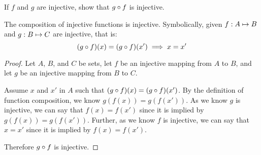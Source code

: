 \documentclass[main.tex]{subfiles}
\begin{document}
\subproblem{}\label{s2p4b}

If \(f\) and \(g\) are injective, show that \({g} \circ{} {f}\) is injective.

\begin{thm}
	The composition of injective functions is injective. Symbolically, given
	\({f}: {A} \mapsto{} {B}\) and \({g}: {B} \mapsto{} {C}\) are injective, that is:
	\[({g} \circ{} {f})(x) = ({g} \circ{} {f})(x') \implies x = x'\]
\end{thm}
\begin{proof}
	Let \(A\), \(B\), and \(C\) be sets, let \(f\) be an injective mapping
	from \(A\) to \(B\), and let \(g\) be an injective mapping from \(B\) to
	\(C\).

	Assume \(x\) and \(x'\) in \(A\) such that
	\(({g} \circ{} {f})(x) = ({g} \circ{} {f})(x')\). By the definition of
	function composition, we know \(g(f(x)) = g(f(x'))\). As we know \(g\)
	is injective, we can say that \(f(x) = f(x')\) since it is implied by
	\(g(f(x)) = g(f(x'))\). Further, as we know \(f\) is injective, we can
	say that \(x = x'\) since it is implied by \(f(x) = f(x')\).

	Therefore \({g} \circ{} {f}\) is injective.
\end{proof}
\end{document}
